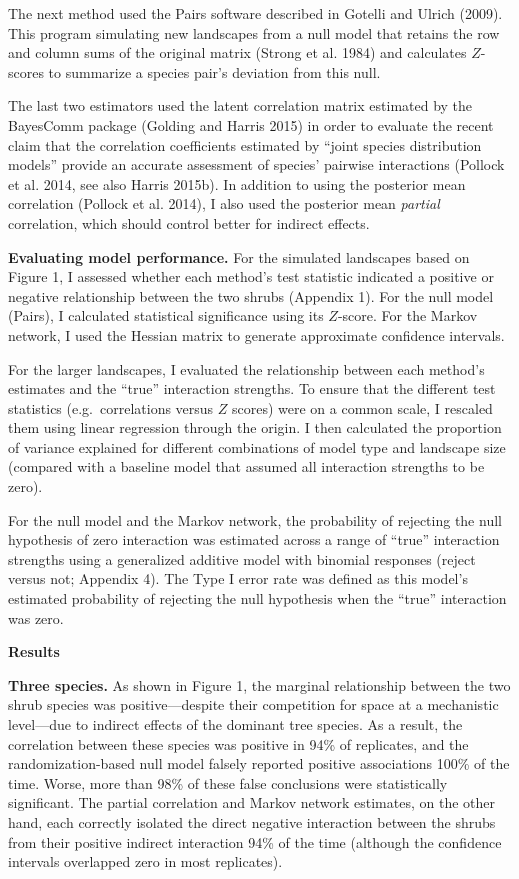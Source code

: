 \documentclass[12pt,]{article}
\begin{document}
\begin{spacing}{1.9}
\begin{flushleft}
The next method used the Pairs software described in Gotelli and Ulrich
(2009). This program simulating new landscapes from a null model that
retains the row and column sums of the original matrix (Strong et al.
1984) and calculates \(Z\)-scores to summarize a species pair's
deviation from this null.

The last two estimators used the latent correlation matrix estimated by
the BayesComm package (Golding and Harris 2015) in order to evaluate the
recent claim that the correlation coefficients estimated by ``joint
species distribution models'' provide an accurate assessment of species'
pairwise interactions (Pollock et al. 2014, see also Harris 2015b). In
addition to using the posterior mean correlation (Pollock et al. 2014),
I also used the posterior mean \emph{partial} correlation, which should
control better for indirect effects.

\noindent \textbf{Evaluating model performance.} For the simulated
landscapes based on Figure 1, I assessed whether each method's test
statistic indicated a positive or negative relationship between the two
shrubs (Appendix 1). For the null model (Pairs), I calculated
statistical significance using its \(Z\)-score. For the Markov network,
I used the Hessian matrix to generate approximate confidence intervals.

For the larger landscapes, I evaluated the relationship between each
method's estimates and the ``true'' interaction strengths. To ensure
that the different test statistics (e.g.~correlations versus \(Z\)
scores) were on a common scale, I rescaled them using linear regression
through the origin. I then calculated the proportion of variance
explained for different combinations of model type and landscape size
(compared with a baseline model that assumed all interaction strengths
to be zero).

For the null model and the Markov network, the probability of rejecting
the null hypothesis of zero interaction was estimated across a range of
``true'' interaction strengths using a generalized additive model with
binomial responses (reject versus not; Appendix 4). The Type I error
rate was defined as this model's estimated probability of rejecting the
null hypothesis when the ``true'' interaction was zero.

\noindent
\textbf{Results}

\noindent \textbf{Three species.} As shown in Figure 1, the marginal
relationship between the two shrub species was positive---despite their
competition for space at a mechanistic level---due to indirect effects
of the dominant tree species. As a result, the correlation between these
species was positive in 94\% of replicates, and the randomization-based
null model falsely reported positive associations 100\% of the time.
Worse, more than 98\% of these false conclusions were statistically
significant. The partial correlation and Markov network estimates, on
the other hand, each correctly isolated the direct negative interaction
between the shrubs from their positive indirect interaction 94\% of the
time (although the confidence intervals overlapped zero in most
replicates).


\end{flushleft}
\end{spacing}
\end{document}
